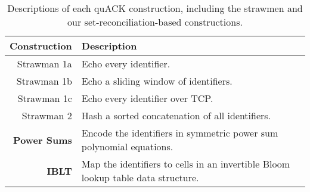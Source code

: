 \begin{table}[t]
  \centering
  \begin{tabular}{rl}
    \toprule
    \bf Construction & \bf Description \\
    \midrule
    Strawman 1a & Echo every identifier. \\
    Strawman 1b & Echo a sliding window of identifiers. \\
    Strawman 1c & Echo every identifier over TCP. \\
    Strawman 2 & Hash a sorted concatenation of all identifiers.\\
    \bf \textcolor{black!50!blue}{Power Sums} & \textcolor{black!50!blue}{Encode the identifiers in symmetric power sum polynomial equations.} \\
    \bf \textcolor{black!50!blue}{IBLT} & \textcolor{black!50!blue}{Map the identifiers to cells in an invertible Bloom lookup table data structure.} \\
    \bottomrule
  \end{tabular}
  \caption{
  Descriptions of each quACK construction, including the strawmen and our
  set-reconciliation-based constructions.
  }
  \label{tab:quack:constructions}
\end{table}
